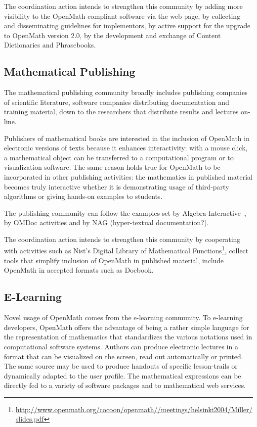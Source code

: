\documentclass{euproposal}
\begin{document}
The coordination action intends to strengthen this community by adding
more visibility to the OpenMath compliant software via the web page,
by collecting and disseminating guidelines for implementors, by active
support for the upgrade to OpenMath version 2.0, by the development
and exchange of Content Dictionaries and Phrasebooks.

\subsection{Mathematical Publishing}
\label{sec:mpubl}

The mathematical publishing community broadly includes publishing
companies of scientific literature, software companies distributing
documentation and training material, down to the researchers that
distribute results and lectures on-line.

Publishers of mathematical books are interested in the inclusion of
OpenMath in electronic versions of texts because it enhances
interactivity: with a mouse click, a mathematical object can be
transferred to a computational program or to visualization software.
The same reason holds true for OpenMath to be incorporated in other
publishing activities: the mathematics in published material becomes
truly interactive whether it is demonstrating usage of third-party
algorithms or giving hands-on examples to students.

The publishing community can follow the examples set by Algebra
Interactive~\cite{ida}, by OMDoc activities\cite{OMDOC} and by NAG
(hyper-textual documentation?).

The coordination action intends to strengthen this community by
cooperating with activities such as Nist's Digital Library of
Mathematical
Functions\footnote{\url{http://www.openmath.org/cocoon/openmath//meetings/helsinki2004/Miller/slides.pdf}},
collect tools that simplify inclusion of OpenMath in published
material, include OpenMath in accepted formats such as Docbook.


\subsection{E-Learning}
\label{sec:e-learn}
Novel usage of OpenMath comes from the e-learning community. To
e-learning developers, OpenMath offers the advantage of being a rather
simple language for the representation of mathematics that
standardizes the various notations used in computational software
systems. Authors can produce electronic lectures in a format that can
be visualized on the screen, read out automatically or printed. The
same source may be used to produce handouts of specific lesson-trails
or dynamically adapted to the user profile. The mathematical
expressions can be directly fed to a variety of software packages and
to mathematical web services.
\end{document}
